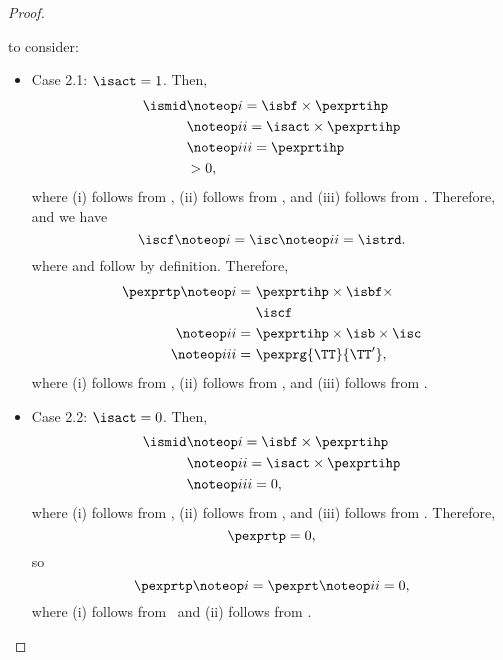 \begin{proof}
\begin{itemize}
       to consider:
      \begin{itemize}
        \item Case 2.1: $\isact = 1$.
          Then,
          \begin{align*}
            \ismid &\noteop i = \isbf \times \pexprtihp\\
                   &\noteop ii = \isact \times \pexprtihp\\
                   &\noteop iii = \pexprtihp\\
                   &> 0,
          \end{align*}
          where 
          (i) follows from \todo,
          (ii) follows from \todo, 
          and
          (iii) follows from \todo.
          Therefore, 
          and we have
          $$\iscf \noteop i = \isc \noteop ii = \istrd.$$
          where  and 
           follow by definition.
          Therefore,
          \begin{align*}
            \pexprtp \noteop i =\ & \pexprtihp \times \isbf \times\\& \iscf\\
            \noteop ii =\ & \pexprtihp \times \isb \times \isc\\
            \noteop iii =\ & \pexprg{\TT}{\TT'},
          \end{align*}
          where 
          (i) follows from \todo,
          (ii) follows from \todo,
          and
          (iii) follows from \todo.

        \item Case 2.2: $\isact = 0$.
          Then,
          \begin{align*}
            \ismid &\noteop i = \isbf \times \pexprtihp\\
                   &\noteop ii = \isact \times \pexprtihp\\
                   &\noteop iii = 0,
          \end{align*}
          where 
          (i) follows from \todo,
          (ii) follows from \todo,
          and
          (iii) follows from \todo.
          Therefore,
          $$\pexprtp = 0,$$
          so
          $$\pexprtp \noteop i = \pexprt \noteop ii = 0,$$
          where
          (i) follows from \todo\ 
          and
          (ii) follows from \todo.
      \end{itemize}
  \end{itemize}
\end{proof}
